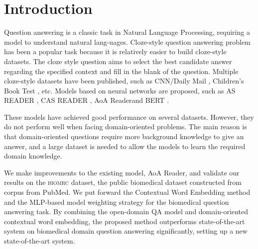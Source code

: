 \documentclass[sigconf, screen]{acmart}
\newcommand{\biomrc}{{\scshape{biomrc}}\xspace}
\newcommand{\aoa}{AoA Reader\xspace}
\begin{document}

\maketitle

\section{Introduction}

Question answering is a classic task in Natural Language Processing, requiring a model to understand natural lang-uages. Cloze-style question answering problem has been a popular task because it is relatively easier to build cloze-style datasets. The cloze style question aims to select the best candidate answer regarding the specified context and fill in the blank of the question. Multiple cloze-style datasets have been published, such as CNN/Daily Mail \cite{hermannTeachingMachinesRead2015}, Children's Book Test \cite{hillGoldilocksPrincipleReading2016},  etc. Models based on neural networks are proposed, such as AS READER \cite{kadlecTextUnderstandingAttention2016}, CAS READER \cite{cuiConsensusAttentionbasedNeural2016}, \aoa \cite{cuiAttentionoverAttentionNeuralNetworks2017}and BERT \cite{devlinBERTPretrainingDeep2019}.

These models have achieved good performance on several datasets. However, they do not perform well when facing domain-oriented problems. The main reason is that domain-oriented questions require more background knowledge to give an answer, and a large dataset is needed to allow the models to learn the required domain knowledge.

We make improvements to the existing model, \aoa, and validate our results on the \biomrc dataset\cite{pappasBioMRCDatasetBiomedical2020}, the public biomedical dataset constructed from corpus from PubMed. We put forward the Contextual Word Embedding method and the MLP-based model weighting strategy for the biomedical question answering task. By combining the open-domain QA model and domain-oriented contextual word embedding, the proposed method outperforms state-of-the-art system on biomedical domain question answering significantly, setting up a new state-of-the-art system.
\end{document}
